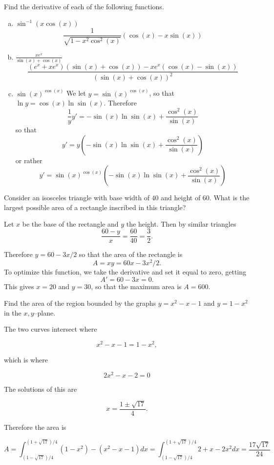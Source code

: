 \documentclass[11pt]{exam}
\theoremstyle{definition}
\begin{document}
\begin{questions}
\newpage
\question[10]\mbox{}
Find the derivative of each of the following functions.
\begin{enumerate}[(a)]
\item  $\sin^{-1}(x\cos(x))$
$$\frac{1}{\sqrt{1-x^2\cos^2(x)}}(\cos(x)-x\sin(x))$$
\item  $\frac{xe^x}{\sin(x) + \cos(x)}$
$$\frac{(e^x + xe^x)(\sin(x) + \cos(x)) - xe^x(\cos(x)-\sin(x))}{(\sin(x) + \cos(x))^2}$$
\item  $\sin(x)^{\cos(x)}$
We let $y =\sin(x)^{\cos(x)}$, so that $\ln y = \cos(x)\ln\sin(x)$.
Therefore
$$\frac{1}{y}y' = -\sin(x)\ln\sin(x) + \frac{\cos^2(x)}{\sin(x)}$$
so that
$$y' = y\left(-\sin(x)\ln\sin(x) + \frac{\cos^2(x)}{\sin(x)}\right)$$
or rather
$$y' = \sin(x)^{\cos(x)}\left(-\sin(x)\ln\sin(x) + \frac{\cos^2(x)}{\sin(x)}\right)$$
\end{enumerate}

\newpage
\question[10]
Consider an isosceles triangle with base width of $40$ and height of $60$.
What is the largest possible area of a rectangle inscribed in this triangle?

Let $x$ be the base of the rectangle and $y$ the height.
Then by similar triangles 
$$\frac{60-y}{x} = \frac{60}{40} = \frac{3}{2}.$$

Therefore $y = 60 - 3x/2$ so that the area of the rectangle is
$$A = xy = 60x - 3x^2/2.$$
To optimize this function, we take the derivative and set it equal to zero, getting
$$A' = 60 - 3x = 0.$$
This gives $x = 20$ and $y=30$, so that the maximum area is $A = 600$.

\newpage
\question[10]
Find the area of the region bounded by the graphs $y=x^2-x-1$ and $y=1-x^2$ in the $x,y$--plane.

The two curves intersect where

$$x^2-x-1 = 1-x^2,$$

which is where

$$2x^2-x-2 = 0$$

The solutions of this are

$$x = \frac{1\pm\sqrt{17}}{4}.$$

Therefore the area is

$$A = \int_{(1-\sqrt{17})/4}^{(1+\sqrt{17})/4} (1-x^2) - (x^2-x-1) dx = \int_{(1-\sqrt{17})/4}^{(1+\sqrt{17})/4} 2+x-2x^2 dx = \frac{17\sqrt{17}}{24}$$


\end{questions}
\end{document}
